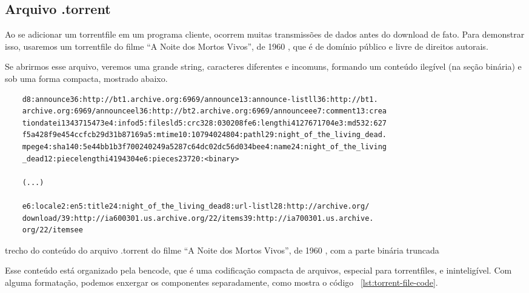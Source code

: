 
\newpage
\subsection*{Arquivo .torrent}
\label{sec:bencode}

Ao se adicionar um \gls*{torrentfile} em um programa cliente, ocorrem muitas
transmissões de dados antes do download de fato. Para demonstrar isso, usaremos um
\gls*{torrentfile} do filme \enquote{A Noite dos Mortos Vivos}, de 1960
\cite{torrent-file}, que é de domínio público e livre de direitos autorais.

Se abrirmos esse arquivo, veremos uma grande \gls{string}, caracteres diferentes e
incomuns, formando um conteúdo ilegível (na seção binária) e sob uma forma compacta,
mostrado abaixo.

\begin{listing}[H]
    \begin{verbatim}
    d8:announce36:http://bt1.archive.org:6969/announce13:announce-listll36:http://bt1.
    archive.org:6969/announceel36:http://bt2.archive.org:6969/announceee7:comment13:crea
    tiondatei1343715473e4:infod5:filesld5:crc328:030208fe6:lengthi4127671704e3:md532:627
    f5a428f9e454ccfcb29d31b87169a5:mtime10:10794024804:pathl29:night_of_the_living_dead.
    mpege4:sha140:5e44bb1b3f700240249a5287c64dc02dc56d034bee4:name24:night_of_the_living
    _dead12:piecelengthi4194304e6:pieces23720:<binary>

    (...)

    e6:locale2:en5:title24:night_of_the_living_dead8:url-listl28:http://archive.org/
    download/39:http://ia600301.us.archive.org/22/items39:http://ia700301.us.archive.
    org/22/itemsee
    \end{verbatim}

    \caption{trecho do conteúdo do arquivo .torrent do filme \enquote{A Noite dos Mortos
    Vivos}, de 1960 \cite{torrent-file}, com a parte binária truncada}
    \label{lst:torrent-file-raw}
\end{listing}

Esse conteúdo está organizado pela \gls{bencode}, que é uma codificação compacta de
arquivos, especial para \glspl*{torrentfile}, e ininteligível. Com alguma formatação,
podemos enxergar os componentes separadamente, como mostra o código
~\ref{lst:torrent-file-code}.

